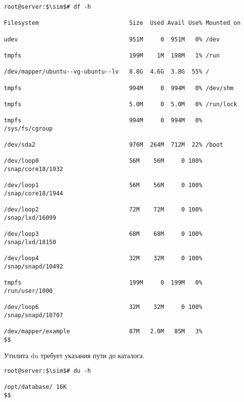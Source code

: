 \documentclass[14pt, a4paper]{article}
\begin{document}
\begin{lstlisting}[mathescape=true]
root@server:$\sim$# df -h

Filesystem                          Size  Used Avail Use% Mounted on

udev                                951M     0  951M   0% /dev

tmpfs                               199M    1M  198M   1% /run

/dev/mapper/ubuntu--vg-ubuntu--lv   8.8G  4.6G  3.8G  55% /
                                            
tmpfs                               994M     0  994M   0% /dev/shm

tmpfs                               5.0M     0  5.0M   0% /run/lock
                                            
tmpfs                               994M     0  994M   0% /sys/fs/cgroup
                                            
/dev/sda2                           976M  264M  712M  22% /boot
                                            
/dev/loop0                          56M    56M     0 100% /snap/core18/1932
                                            
/dev/loop1                          56M    56M     0 100% /snap/core18/1944
                                           
/dev/loop2                          72M    72M     0 100% /snap/lxd/16099
                                            
/dev/loop3                          68M    68M     0 100% /snap/lxd/18150

/dev/loop4                          32M    32M     0 100% /snap/snapd/10492

tmpfs                               199M     0  199M   0% /run/user/1000

/dev/loop6                          32M    32M     0 100% /snap/snapd/10707

/dev/mapper/example                 87M   2.0M   85M   3%
$$
\end{lstlisting}
\vspace{0.2cm}

Утилита du требует указания пути до каталога.
\vspace{0.3cm}

\begin{lstlisting}[mathescape=true]
root@server:$\sim$# du -h

/opt/database/ 16K
$$
\end{lstlisting}
\end{document}
